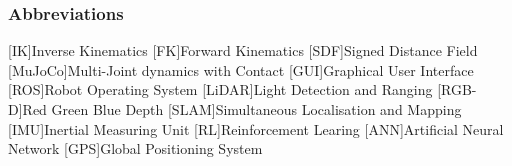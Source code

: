 \subsubsection*{Abbreviations}
    \hfill\begin{minipage}{\dimexpr\textwidth-\NomLblSep}
        \begin{acronym}[MMMMMMii]
            [IK]{Inverse Kinematics}
            [FK]{Forward Kinematics}
            [SDF]{Signed Distance Field}
            [MuJoCo]{Multi-Joint dynamics with Contact}
            [GUI]{Graphical User Interface}
            [ROS]{Robot Operating System}
            [LiDAR]{Light Detection and Ranging}
            [RGB-D]{Red Green Blue Depth}
            [SLAM]{Simultaneous Localisation and Mapping}
            [IMU]{Inertial Measuring Unit}
            [RL]{Reinforcement Learing}
            [ANN]{Artificial Neural Network}
            [GPS]{Global Positioning System}
        \end{acronym}       
    \end{minipage}
